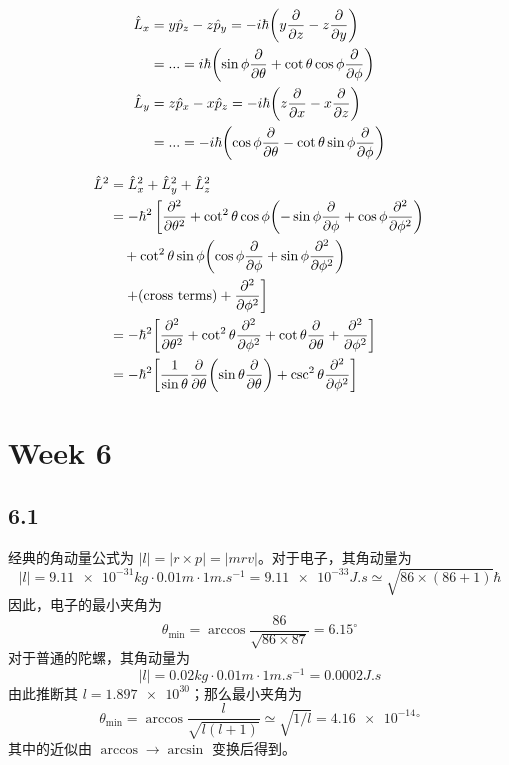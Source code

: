 \begin{align}
\hat L_x &= y \hat p_z - z \hat p_y = -i\hbar \qty(y \pdv{z} - z\pdv{y}) \notag\\
&= ... = i\hbar \qty(\sin\phi \pdv{\theta} + \cot\theta\cos\phi\pdv{\phi}) \\
\hat L_y &= z \hat p_x - x \hat p_z = -i\hbar \qty(z \pdv{x} - x\pdv{z}) \notag\\
&= ... = -i\hbar \qty(\cos\phi \pdv{\theta} - \cot\theta\sin\phi\pdv{\phi}) 
\end{align}

\begin{align}
\hat L^2 &= \hat L_x^2 + \hat L_y^2 + \hat L_z^2 \notag\\
&= -\hbar^2 \left[\pdv[2]{\theta} + \cot^2\theta \cos\phi \qty(-\sin\phi\pdv{\phi} + \cos\phi\pdv[2]{\phi})  \right. \notag\\
&{}\quad + \cot^2\theta \sin\phi \qty(\cos\phi\pdv{\phi} + \sin\phi\pdv[2]{\phi}) \notag\\
& {}\quad \left. + (\text{cross terms}) + \pdv[2]{\phi} \right] \notag\\
&= -\hbar^2 \qty[\pdv[2]{\theta} + \cot^2\theta \pdv[2]{\phi} + \cot\theta\pdv\theta + \pdv[2]{\phi} ] \notag\\
&= -\hbar^2 \qty[\dfrac{1}{\sin\theta}\pdv{\theta}\qty(\sin\theta\pdv{\theta})  + \csc^2\theta \pdv[2]{\phi}  ]
\end{align}

\section{Week 6}
\subsection{6.1}
经典的角动量公式为 $|l| = |r \times p| = |m r v|$。对于电子，其角动量为
\begin{equation*}
|l| = \num{9.11e-31} \si{kg} \cdot \num{0.01} \si{m} \cdot \num{1} \si{m.s^{-1}} = \num{9.11e-33} \si{J.s} \simeq \sqrt{86 \times (86+1)} \hbar
\end{equation*}
因此，电子的最小夹角为
\begin{equation*}
\theta_\mathrm{min} = \arccos \frac{86}{\sqrt{86 \times 87}} = 6.15^\circ
\end{equation*}
对于普通的陀螺，其角动量为
\begin{equation*}
|l| = \num{0.02} \si{kg} \cdot \num{0.01} \si{m} \cdot \num{1} \si{m.s^{-1}}= \num{0.0002} \si{J.s}
\end{equation*}
由此推断其 $l = \num{1.897e30}$；那么最小夹角为
\begin{equation*}
\theta_\mathrm{min} = \arccos \frac{l}{\sqrt{l (l + 1)}} \simeq \sqrt{1/l} = \num{4.16e-14} {}^\circ
\end{equation*}
其中的近似由 $\arccos \rightarrow \arcsin$ 变换后得到。

